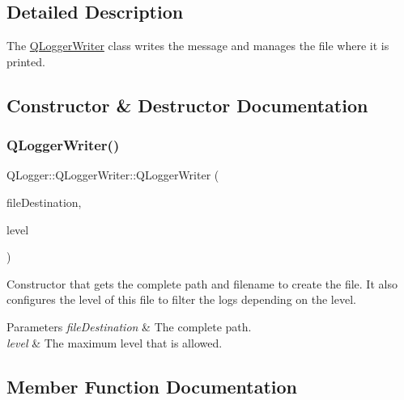 \subsection{Detailed Description}
The \mbox{\hyperlink{class_q_logger_1_1_q_logger_writer}{Q\+Logger\+Writer}} class writes the message and manages the file where it is printed. 

\subsection{Constructor \& Destructor Documentation}
\mbox{\label{class_q_logger_1_1_q_logger_writer_ae0ae01f345bbc61fe4c497c2255cac28}} 
\subsubsection{\texorpdfstring{QLoggerWriter()}{QLoggerWriter()}}
{\footnotesize\ttfamily Q\+Logger\+::\+Q\+Logger\+Writer\+::\+Q\+Logger\+Writer (\begin{DoxyParamCaption}\item[{const Q\+String \&}]{file\+Destination,  }\item[{Log\+Level}]{level }\end{DoxyParamCaption})\hspace{0.3cm}{\ttfamily [explicit]}}



Constructor that gets the complete path and filename to create the file. It also configures the level of this file to filter the logs depending on the level. 


\begin{DoxyParams}{Parameters}
{\em file\+Destination} & The complete path. \\
\hline
{\em level} & The maximum level that is allowed. \\
\hline
\end{DoxyParams}


\subsection{Member Function Documentation}
\mbox{\label{class_q_logger_1_1_q_logger_writer_ae4f61d59ae0ca39058ad70eeda3e6543}} 
